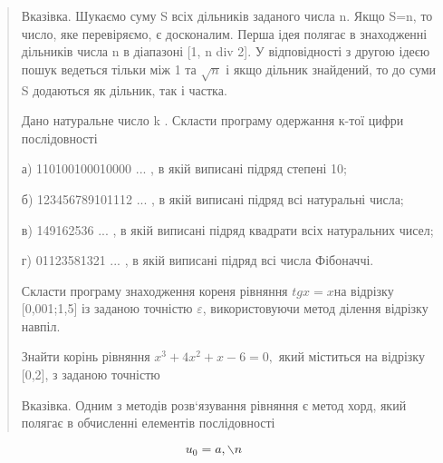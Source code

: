 \documentclass[]{article}
\begin{document}
\begin{quote}
Вказівка. Шукаємо суму S всіх дільників заданого числа n. Якщо S=n, то
число, яке перевіряємо, є досконалим. Перша ідея полягає в знаходженні
дільників числа n в діапазоні {[}1, n div 2{]}. У відповідності з другою
ідеєю пошук ведеться тільки між 1 та \(\sqrt{n}\) і якщо дільник
знайдений, то до суми S додаються як дільник, так і частка.

Дано натуральне число k . Скласти програму одержання к-тої цифри
послідовності

а) 110100100010000 ... , в якій виписані підряд степені 10;

б) 123456789101112 ... , в якій виписані підряд всі натуральні числа;

в) 149162536 ... , в якій виписані підряд квадрати всіх натуральних
чисел;

г) 01123581321 ... , в якій виписані підряд всі числа Фібоначчі.

Скласти програму знаходження кореня рівняння \(tgx = x\)на відрізку
{[}0,001;1,5{]} із заданою точністю \(\varepsilon\), використовуючи
метод ділення відрізку навпіл.

\protect\hypertarget{_Hlk65242386}{}{}Знайти корінь рівняння
\(x^{3} + 4x^{2} + x - 6 = 0,\) який міститься на відрізку {[}0,2{]}, з
заданою точністю

Вказівка. Одним з методів розв`язування рівняння є метод хорд, який
полягає в обчисленні елементів послідовності
\end{quote}

\[u_{0} = a,\backslash n\]
\end{document}
